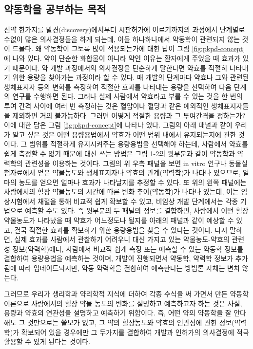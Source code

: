 \documentclass[
  11pt,
  krantz2, a4paper, twoside]{krantz}
\begin{document}
\hypertarget{uxc57duxb3d9uxd559uxc744-uxacf5uxbd80uxd558uxb294-uxbaa9uxc801}{%
\subsection{약동학을 공부하는 목적}\label{uxc57duxb3d9uxd559uxc744-uxacf5uxbd80uxd558uxb294-uxbaa9uxc801}}

신약 한가지를 발견(discovery)에서부터 시판허가에 이르기까지의 과정에서
단계별로 수없이 많은 의사결정들을 하게 되는데, 이들 하나하나에서
약동학이 관련되지 않는 것이 드물다. 왜 약동학이 그토록 많이 적용되는가에
대한 답이 그림 \ref{fig:pkpd-concept}에 나와 있다. 약이 단순한 화합물이 아니라 약인 이유는
환자에게 주었을 때 효과가 있기 때문이다. 약 개발 과정에서의 의사결정을
단순하게 말한다면 약효를 적절히 나타내기 위한 용량을 찾아가는 과정이라
할 수 있다. 매 개발의 단계마다 약효나 그와 관련된 생체표지자 등의 변화를
측정하여 적절한 효과를 나타내는 용량을 선택하여 다음 단계의 연구를
수행하면 된다. 그러나 실제 사람에서 약효라고 부를 수 있는 것을 한 번의
투여 간격 사이에 여러 번 측정하는 것은 혈압이나 혈당과 같은 예외적인
생체표지자들을 제외하면 거의 불가능하다. 그러면 어떻게 적절한 용량과 그
투여간격을 정하는가? 이에 대한 답은 그림 \ref{fig:pkpd-concept}에 나타나 있다. 그림의 아래
패널과 같이 우리가 알고 싶은 것은 어떤 용량용법에서 약효가 어떤 범위
내에서 유지되는지에 관한 것이다. 그 범위를 적절하게 유지시켜주는
용량용법을 선택해야 하는데, 사람에서 약효를 쉽게 측정할 수 없기 때문에
대신 쓰는 방법은 그림 1-2의 윗부분과 같이 약동학과 약력학의 관련성을
이용하는 것이다. 그림의 위 우측 패널을 보면 in vitro 연구나
동물실험자료에서 얻은 약물농도와 생체표지자나 약효의 관계(약력학)가
나타나 있으므로, 얼마의 농도를 얻으면 얼마나 효과가 나타날지를 추정할 수
있다. 또 위의 왼쪽 패널에는 사람에서의 혈장 약물농도의 시간에 따른 변화
추이(약동학)가 나타나 있는데, 이는 임상시험에서 채혈을 통해 비교적 쉽게
확보할 수 있고, 비임상 개발 단계에서는 각종 기법으로 예측할 수도 있다.
즉 윗부분의 두 패널의 정보를 결합하면, 사람에서 어떤 혈장 약물농도가
나타났을 때 약효가 어느정도나 될지를 아래의 패널과 같이 예상할 수 있고,
결국 적절한 효과를 확보하기 위한 용량용법을 찾을 수 있다는 것이다. 다시
말하면, 실제 효과를 사람에서 관찰하기 어려우니 대신 가지고 있는
약물농도-약효의 관련성 정보(약력학)에다, 사람에서 비교적 쉽게 측정 또는
예측할 수 있는 약동학 정보를 결합하여 용량용법을 예측하는 것이며, 개발이
진행되면서 약동학, 약력학 정보가 추가됨에 따라 업데이트되지만,
약동-약력학을 결합하여 예측한다는 방법론 자체는 변치 않는다.

그러므로 우리가 생리학과 약리학적 지식에 더하여 각종 수식을 써 가면서
만든 약동학 이론으로 사람에서의 혈장 약물 농도의 변화를 설명하고
예측하고자 하는 것은 사실, 용량과 약효의 연관성을 설명하고 예측하기
위함이다. 즉, 어떤 약의 약동학을 잘 안다 해도 그 것만으로는 쓸모가 없고,
그 약의 혈장농도와 약효의 연관성에 관한 정보(약력학)가 확보되어 있을
경우에만 그 두가지를 결합하여 개발과 인허가의 의사결정에 적극 활용할 수
있게 된다는 것이다.
\end{document}

